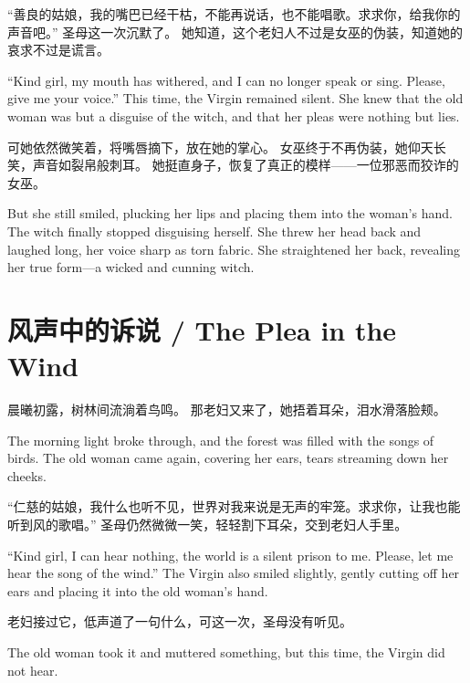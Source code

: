 “善良的姑娘，我的嘴巴已经干枯，不能再说话，也不能唱歌。求求你，给我你的声音吧。”  
圣母这一次沉默了。  
她知道，这个老妇人不过是女巫的伪装，知道她的哀求不过是谎言。  
\begin{flushright}
“Kind girl, my mouth has withered, and I can no longer speak or sing. Please, give me your voice.”  
This time, the Virgin remained silent.  
She knew that the old woman was but a disguise of the witch, and that her pleas were nothing but lies.
\end{flushright}

可她依然微笑着，将嘴唇摘下，放在她的掌心。  
女巫终于不再伪装，她仰天长笑，声音如裂帛般刺耳。  
她挺直身子，恢复了真正的模样——一位邪恶而狡诈的女巫。  
\begin{flushright}
But she still smiled, plucking her lips and placing them into the woman's hand.  
The witch finally stopped disguising herself. She threw her head back and laughed long, her voice sharp as torn fabric.  
She straightened her back, revealing her true form—a wicked and cunning witch.
\end{flushright}

\section*{风声中的诉说 / The Plea in the Wind}

晨曦初露，树林间流淌着鸟鸣。  
那老妇又来了，她捂着耳朵，泪水滑落脸颊。  
\begin{flushright}
The morning light broke through, and the forest was filled with the songs of birds.  
The old woman came again, covering her ears, tears streaming down her cheeks.
\end{flushright}

“仁慈的姑娘，我什么也听不见，世界对我来说是无声的牢笼。求求你，让我也能听到风的歌唱。”  
圣母仍然微微一笑，轻轻割下耳朵，交到老妇人手里。  
\begin{flushright}
“Kind girl, I can hear nothing, the world is a silent prison to me. Please, let me hear the song of the wind.”  
The Virgin also smiled slightly, gently cutting off her ears and placing it into the old woman's hand.
\end{flushright}

老妇接过它，低声道了一句什么，可这一次，圣母没有听见。  
\begin{flushright}
The old woman took it and muttered something, but this time, the Virgin did not hear.
\end{flushright}

